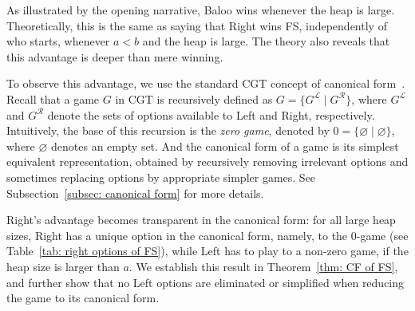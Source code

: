 \documentclass[oneside,reqno]{amsart}
\begin{document}

As illustrated by the opening narrative, Baloo wins whenever the heap is large. Theoretically, this is the same as saying that Right wins {\sc FS}, independently of who starts, whenever $a<b$ and the heap is large. The theory also reveals that this advantage is deeper than mere winning. 

To observe this advantage, we use the standard CGT concept of canonical form~\cite{S2013}. Recall that a game $G$ in CGT is recursively defined as $G = \{G^{\mathcal{L}} \mid G^{\mathcal{R}}\}$, where $G^{\mathcal{L}}$ and $G^{\mathcal{R}}$ denote the sets of options available to Left and Right, respectively. Intuitively, the base of this recursion is the \emph{zero game}, denoted by $0 = \{\varnothing \mid \varnothing\}$, where $\varnothing$ denotes an empty set. And the canonical form of a game is its simplest equivalent representation, obtained by recursively removing irrelevant options and sometimes replacing options by appropriate simpler games. See Subsection~\ref{subsec: canonical form} for more details.

Right's advantage becomes transparent in the canonical form: for all large heap sizes, Right has a unique option in the canonical form, namely, to the $0$-game (see Table~\ref{tab: right options of FS}), while Left has to play to a non-zero game, if the heap size is larger than $a$. We establish this result in Theorem~\ref{thm: CF of FS}, and further show that no Left options are eliminated or simplified when reducing the game to its canonical form.
\end{document}
